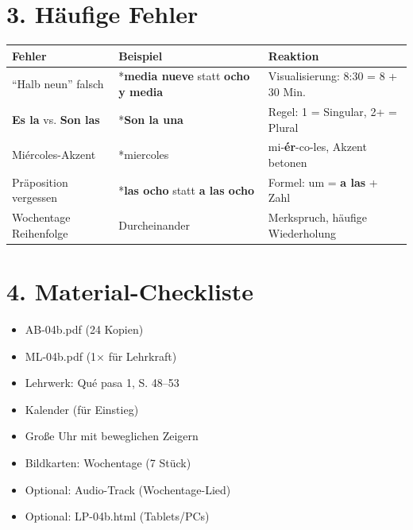 \documentclass[11pt, a4paper]{article}
\newcommand{\fachfarbe}{spanisch}
\newcommand{\sequenz}{04}
\newcommand{\block}{b}
\newcommand{\lerngruppengroesse}{24}
\newcommand{\es}[1]{\textcolor{\fachfarbe}{\textbf{#1}}}
\begin{document}

\section*{3. Häufige Fehler}

\begin{fehlerbox}
\begin{tabularx}{\textwidth}{|l|X|X|}
\hline
\textbf{Fehler} & \textbf{Beispiel} & \textbf{Reaktion} \\
\hline
``Halb neun'' falsch & *\es{media nueve} statt \es{ocho y media} & Visualisierung: 8:30 = 8 + 30 Min. \\
\hline
\es{Es la} vs. \es{Son las} & *\es{Son la una} & Regel: 1 = Singular, 2+ = Plural \\
\hline
Miércoles-Akzent & *miercoles & mi-\textbf{ér}-co-les, Akzent betonen \\
\hline
Präposition vergessen & *\es{las ocho} statt \es{a las ocho} & Formel: um = \es{a las} + Zahl \\
\hline
Wochentage Reihenfolge & Durcheinander & Merkspruch, häufige Wiederholung \\
\hline
\end{tabularx}
\end{fehlerbox}


\section*{4. Material-Checkliste}

\begin{materialbox}
\begin{itemize}[label=$\square$]
    \item AB-\sequenz\block.pdf (\lerngruppengroesse{} Kopien)
    \item ML-\sequenz\block.pdf (1× für Lehrkraft)
    \item Lehrwerk: Qué pasa 1, S. 48--53
    \item Kalender (für Einstieg)
    \item Große Uhr mit beweglichen Zeigern
    \item Bildkarten: Wochentage (7 Stück)
    \item Optional: Audio-Track (Wochentage-Lied)
    \item Optional: LP-\sequenz\block.html (Tablets/PCs)
\end{itemize}
\end{materialbox}
\end{document}
